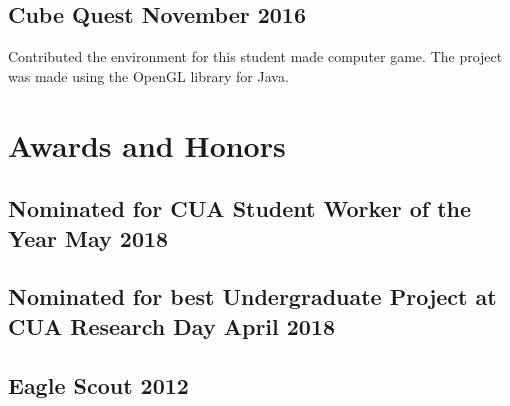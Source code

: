 \documentclass[12pt, letterpaper]{article}
\begin{document}
\subsection{Cube Quest \hfill November 2016}
\justify
Contributed the environment for this student made computer game.
The project was made using the OpenGL library for Java.


\section{Awards and Honors}
\subsection{Nominated for CUA Student Worker of the Year \hfill May 2018}
\subsection{Nominated for best Undergraduate Project at CUA Research Day \hfill April 2018}
\subsection{Eagle Scout \hfill 2012}
\end{document}
